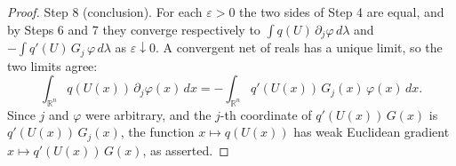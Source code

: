 \begin{proof}
Step 8 (conclusion).  For each $\varepsilon > 0$ the two sides of Step 4 are
equal, and by Steps 6 and 7 they converge respectively to
$\int q(U)\,\partial_j\varphi \, d\lambda$ and
$-\int q'(U)\,G_j\,\varphi\, d\lambda$ as $\varepsilon \downarrow 0$.  A
convergent net of reals has a unique limit, so the two limits agree:
\[
  \int_{\mathbb{R}^n} q(U(x))\, \partial_j \varphi(x)\, dx
    = -\int_{\mathbb{R}^n} q'(U(x))\,G_j(x)\, \varphi(x)\, dx .
\]
Since $j$ and $\varphi$ were arbitrary, and the $j$-th coordinate of
$q'(U(x))\,G(x)$ is $q'(U(x))\,G_j(x)$, the function $x \mapsto q(U(x))$ has
weak Euclidean gradient $x \mapsto q'(U(x))\,G(x)$, as asserted.
\end{proof}
